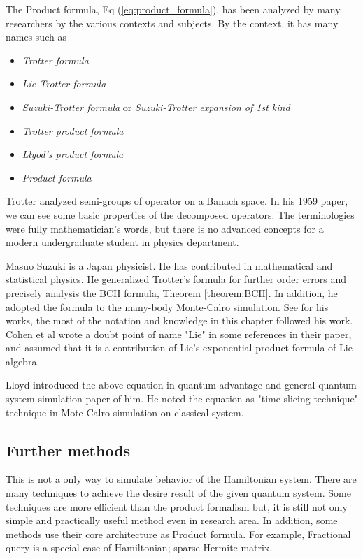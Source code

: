 The Product formula, Eq (\ref{eq:product_formula}), has been analyzed by many researchers by the various contexts and subjects.
By the context, it has many names such as

\begin{itemize}
    \item \textit{Trotter formula}
    \item \textit{Lie-Trotter formula}
    \item \textit{Suzuki-Trotter formula} or \textit{Suzuki-Trotter expansion of 1st kind}  
    \item \textit{Trotter product formula}
    \item \textit{Llyod's product formula}
    \item \textit{Product formula}
\end{itemize}

Trotter analyzed semi-groups of operator on a Banach space\cite{trotter_product_1959}.
In his 1959 paper, we can see some basic properties of the decomposed operators.
The terminologies were fully mathematician's words, but there is no 
advanced concepts for a modern undergraduate student in physics department.

Masuo Suzuki is a Japan physicist. He has contributed in mathematical and statistical physics.
He generalized Trotter's formula for further order errors and precisely analysis the 
BCH formula, Theorem \ref{theorem:BCH}. 
In addition, he adopted the formula to the many-body Monte-Calro simulation. 
See \cite{suzuki_finding_2005} for his works, the most of the notation and knowledge in this chapter 
followed his work.
Cohen et al wrote a doubt point of name "Lie" in some references in their paper\cite{cohen_eigenvalue_1982}, 
and assumed that it is a contribution of Lie's exponential product formula of Lie-algebra.

Lloyd introduced the above equation in quantum advantage and general quantum system 
simulation paper of him\cite{lloyd_universal_1996}. 
He noted the equation as "time-slicing technique" technique in Mote-Calro simulation on classical system.

\subsection{Further methods}

This is not a only way to simulate behavior of the Hamiltonian system. 
There are many techniques to achieve the desire result of the given quantum system.
Some techniques are more efficient than the product formalism but, it is still not only simple and 
practically useful method even in research area. 
In addition, some methods use their core architecture as Product formula.
For example, Fractional query is a special case of Hamiltonian; sparse Hermite matrix.%

